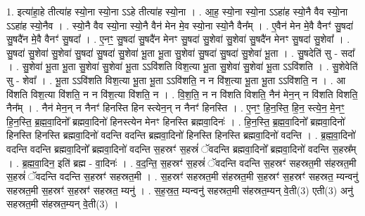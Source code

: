 \documentclass[17pt]{extarticle}
\begin{document}
1. इत्या॑हा॒हे तीत्या॑ह स्यो॒ना स्यो॒ना ऽऽहे तीत्या॑ह स्यो॒ना । . आ॒ह॒ स्यो॒ना स्यो॒ना ऽऽहा॑ह स्यो॒नै वैव स्यो॒ना ऽऽहा॑ह स्यो॒नैव । . स्यो॒नै वैव स्यो॒ना स्यो॒नै वैन॑ मेन मे॒व स्यो॒ना स्यो॒नै वैन᳚म् । . ए॒वैन॑ मेन मे॒वै वैनꣳ॑ सु॒षदा॑ सु॒षदै॑न मे॒वै वैनꣳ॑ सु॒षदा᳚ । . ए॒नꣳ॒॒ सु॒षदा॑ सु॒षदै॑न मेनꣳ सु॒षदा॑ सु॒शेवा॑ सु॒शेवा॑ सु॒षदै॑न मेनꣳ सु॒षदा॑ सु॒शेवा᳚ । . सु॒षदा॑ सु॒शेवा॑ सु॒शेवा॑ सु॒षदा॑ सु॒षदा॑ सु॒शेवा॑ भू॒ता भू॒ता सु॒शेवा॑ सु॒षदा॑ सु॒षदा॑ सु॒शेवा॑ भू॒ता । . सु॒षदेति॑ सु - सदा᳚ । . सु॒शेवा॑ भू॒ता भू॒ता सु॒शेवा॑ सु॒शेवा॑ भू॒ता ऽऽवि॑शति विश॒त्या भू॒ता सु॒शेवा॑ सु॒शेवा॑ भू॒ता ऽऽवि॑शति । . सु॒शेवेति॑ सु - शेवा᳚ । . भू॒ता ऽऽवि॑शति विश॒त्या भू॒ता भू॒ता ऽऽवि॑शति॒ न न वि॑श॒त्या भू॒ता भू॒ता ऽऽवि॑शति॒ न । . आ वि॑शति विश॒त्या वि॑शति॒ न न वि॑श॒त्या वि॑शति॒ न । . वि॒श॒ति॒ न न वि॑शति विशति॒ नैन॑ मेन॒न् न वि॑शति विशति॒ नैन᳚म् । . नैन॑ मेन॒न् न नैनꣳ॑ हिनस्ति हिन स्त्येन॒न् न नैनꣳ॑ हिनस्ति । . ए॒नꣳ॒॒ हि॒न॒स्ति॒ हि॒न॒ स्त्ये॒न॒ मे॒नꣳ॒॒ हि॒न॒स्ति॒ ब्र॒ह्म॒वा॒दिनो᳚ ब्रह्मवा॒दिनो॑ हिनस्त्येन मेनꣳ हिनस्ति ब्रह्मवा॒दिनः॑ । . हि॒न॒स्ति॒ ब्र॒ह्म॒वा॒दिनो᳚ ब्रह्मवा॒दिनो॑ हिनस्ति हिनस्ति ब्रह्मवा॒दिनो॑ वदन्ति वदन्ति ब्रह्मवा॒दिनो॑ हिनस्ति हिनस्ति ब्रह्मवा॒दिनो॑ वदन्ति । . ब्र॒ह्म॒वा॒दिनो॑ वदन्ति वदन्ति ब्रह्मवा॒दिनो᳚ ब्रह्मवा॒दिनो॑ वदन्ति स॒हस्रꣳ॑ स॒हस्रं॑ ॅवदन्ति ब्रह्मवा॒दिनो᳚ ब्रह्मवा॒दिनो॑ वदन्ति स॒हस्र᳚म् । . ब्र॒ह्म॒वा॒दिन॒ इति॑ ब्रह्म - वा॒दिनः॑ । . व॒द॒न्ति॒ स॒हस्रꣳ॑ स॒हस्रं॑ ॅवदन्ति वदन्ति स॒हस्रꣳ॑ सहस्रत॒मी स॑हस्रत॒मी स॒हस्रं॑ ॅवदन्ति वदन्ति स॒हस्रꣳ॑ सहस्रत॒मी । . स॒हस्रꣳ॑ सहस्रत॒मी स॑हस्रत॒मी स॒हस्रꣳ॑ स॒हस्रꣳ॑ सहस्रत॒ म्यन्वनु॑ सहस्रत॒मी स॒हस्रꣳ॑ स॒हस्रꣳ॑ सहस्रत॒ म्यनु॑ । . स॒ह॒स्र॒त॒ म्यन्वनु॑ सहस्रत॒मी स॑हस्रत॒म्यन् वे॒ती(3) एती(3) अनु॑ सहस्रत॒मी स॑हस्रत॒म्यन् वे॒ती(3) । \newline
\end{document}
